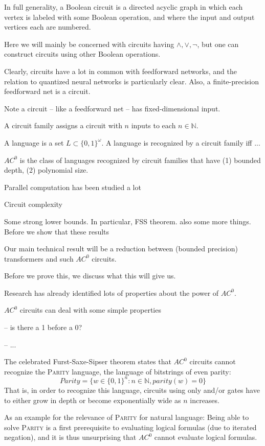\documentclass[11pt,a4paper]{article}
\newcounter{theorem}
\begin{document}
In full generality, a Boolean circuit is a directed acyclic graph in which each vertex is labeled with some Boolean operation, and where the input and output vertices each are numbered.

Here we will mainly be concerned with circuits having $\wedge, \vee, \neg$, but one can construct circuits using other Boolean operations.

Clearly, circuits have a lot in common with feedforward networks, and the relation to quantized neural networks is particularly clear.
Also, a finite-precision feedforward net is a circuit.

Note a circuit -- like a feedforward net -- has fixed-dimensional input.

A circuit family assigns a circuit with $n$ inputs to each $n \in \mathbb{N}$.

A language is a set $L \subset \{0,1\}^\omega$.
A language is recognized by a circuit family iff ...

$AC^0$ is the class of languages recognized by circuit families that have (1) bounded depth, (2) polynomial size.





Parallel computation has been studied a lot

Circuit complexity

Some strong lower bounds.
In particular, FSS theorem. also some more things.
Before we show that these results

Our main technical result will be a reduction between (bounded precision) transformers and such $AC^0$ circuits.


Before we prove this, we discuss what this will give us.

Research has already identified lots of properties about the power of $AC^0$.

$AC^0$ circuits can deal with some simple properties

-- is there a 1 before a 0?

-- ...



The celebrated Furst-Saxe-Sipser theorem states that $AC^0$ circuits cannot recognize the \textsc{Parity} language, the language of bitstrings of even parity:
$$Parity = \{w \in \{0,1\}^n : n \in \mathbb{N}, parity(w) = 0\}$$
That is, in order to recognize this language, circuits using only and/or gates have to either grow in depth or become exponentially wide as $n$ increases.

As an example for the relevance of \textsc{Parity} for natural language:
Being able to solve \textsc{Parity} is a first prerequisite to evaluating logical formulas (due to iterated negation), and it is thus unsurprising that $AC^0$ cannot evaluate logical formulas.
\end{document}
